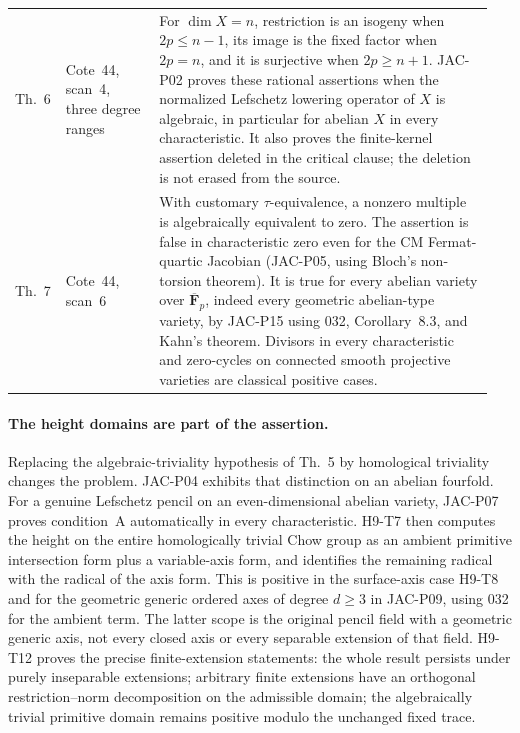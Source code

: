 \begin{longtable}{@{}p{0.08\linewidth}p{0.19\linewidth}p{0.68\linewidth}@{}}
Th.~6 & Cote~44, scan~4, three degree ranges &
For $\dim X=n$, restriction is an isogeny when $2p\le n-1$,
its image is the fixed factor when $2p=n$, and it is surjective
when $2p\ge n+1$. JAC-P02 proves these rational assertions when
the normalized Lefschetz lowering operator of $X$ is algebraic,
in particular for abelian $X$ in every characteristic. It also
proves the finite-kernel assertion deleted in the critical clause;
the deletion is not erased from the source.\\

Th.~7 & Cote~44, scan~6 &
With customary $\tau$-equivalence, a nonzero multiple is
algebraically equivalent to zero. The assertion is false in
characteristic zero even for the CM Fermat-quartic Jacobian
(JAC-P05, using Bloch's non-torsion theorem).
It is true for every abelian variety over $\overline{\mathbf F}_p$,
indeed every geometric abelian-type variety, by JAC-P15 using
032, Corollary~8.3, and Kahn's theorem. Divisors in every
characteristic and zero-cycles on connected smooth projective
varieties are classical positive cases.\\
\bottomrule
\end{longtable}
\endgroup

\paragraph{The height domains are part of the assertion.}
Replacing the algebraic-triviality hypothesis of Th.~5 by
homological triviality changes the problem. JAC-P04 exhibits that
distinction on an abelian fourfold. For a genuine Lefschetz pencil
on an even-dimensional abelian variety, JAC-P07 proves condition~A
automatically in every characteristic. H9-T7 then computes the
height on the entire homologically trivial Chow group as an
ambient primitive intersection form plus a variable-axis form,
and identifies the remaining radical with the radical of the axis
form. This is positive in the surface-axis case
H9-T8 and for the geometric generic ordered axes of degree
$d\ge3$ in JAC-P09, using 032 for the ambient term. The latter
scope is the original pencil field with a geometric generic axis,
not every closed axis or every separable extension of that field.
H9-T12 proves the precise finite-extension statements: the whole
result persists under purely inseparable extensions; arbitrary
finite extensions have an orthogonal restriction--norm
decomposition on the admissible domain; the algebraically trivial
primitive domain remains positive modulo the unchanged fixed trace.

